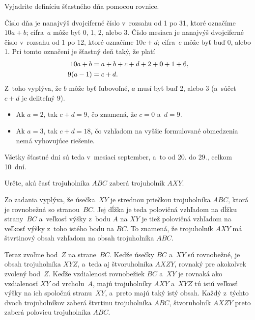 {%
\napad
Vyjadrite definíciu šťastného dňa pomocou rovnice.

\riesenie
Číslo dňa je nanajvýš dvojciferné číslo v~rozsahu od 1 po 31, ktoré označíme
$10a+b$;
cifra~$a$ môže byť 0, 1, 2, alebo 3.
Číslo mesiaca je nanajvýš dvojciferné číslo v~rozsahu od 1 po 12, ktoré označíme
$10c+d$;
cifra~$c$ môže byť buď 0, alebo 1.
Pri tomto označení je šťastný deň taký, že platí
$$
\aligned
10a+b &=a+b+c+d+2+0+1+6, \\
9(a-1) &=c+d.
\endaligned
$$
Z~toho vyplýva, že $b$ môže byť ľubovoľné, $a$ musí byť buď 2, alebo 3 (a~súčet
$c+d$ je deliteľný 9).
\begin{itemize}
\item Ak $a=2$, tak $c+d=9$, čo znamená, že $c=0$ a~$d=9$.
\item Ak $a=3$, tak $c+d=18$, čo vzhľadom na vyššie formulované obmedzenia
nemá vyhovujúce riešenie.
\end{itemize}
Všetky šťastné dni sú teda v~mesiaci september, a~to od 20. do 29., celkom 10~dní.
}

{%
\napad
Určte, akú časť trojuholníka $ABC$ zaberá trojuholník $AXY$.

\riesenie
Zo zadania vyplýva, že úsečka~$XY$ je strednou priečkou trojuholníka $ABC$, ktorá
je rovnobežná so stranou~$BC$.
Jej dĺžka je teda polovičná vzhľadom na dĺžku strany~$BC$ a~veľkosť
výšky z~bodu $A$ na $XY$ je tiež polovičná vzhľadom na veľkosť výšky
z~toho istého bodu na $BC$. To znamená, že trojuholník $AXY$ má štvrtinový
obsah vzhľadom na obsah trojuholníka $ABC$.
%


Teraz zvoľme bod~$Z$ na strane~$BC$.
Keďže úsečky $BC$ a~$XY$ sú rovnobežné, je obsah trojuholníka $XYZ$,
a~teda aj štvoruholníka $AXZY$, rovnaký pre akokoľvek zvolený bod~$Z$.
Keďže vzdialenosť rovnobežiek $BC$ a~$XY$ je rovnaká ako vzdialenosť $XY$
od vrcholu~$A$, majú trojuholníky $AXY$ a~$XYZ$ tú istú veľkosť výšky
na ich spoločnú stranu~$XY$, a~preto majú taký istý obsah.
Každý z~týchto dvoch trojuholníkov zaberá štvrtinu trojuholníka $ABC$,
štvoruholník $AXZY$ preto zaberá polovicu trojuholníka $ABC$.
}

